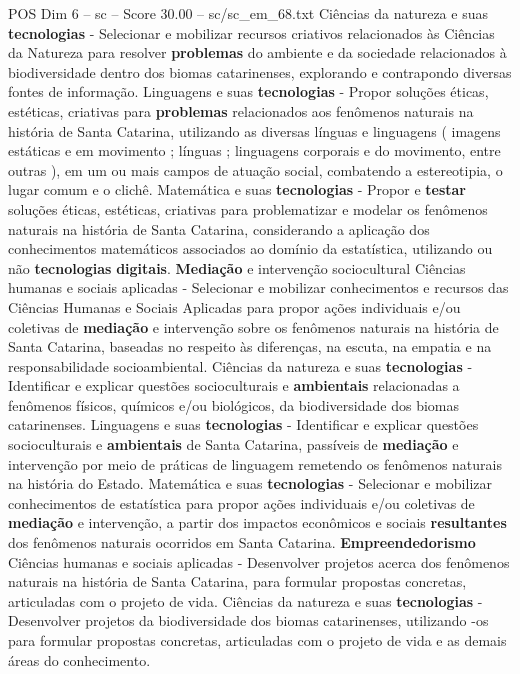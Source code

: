\begin{textsample}{POS Dim 6 – sc – Score 30.00 – sc/sc\_em\_68.txt}
Ciências da natureza e suas \textbf{tecnologias} - Selecionar e mobilizar recursos criativos relacionados às Ciências da Natureza para resolver \textbf{problemas} do ambiente e da sociedade relacionados à biodiversidade dentro dos biomas catarinenses, explorando e contrapondo diversas fontes de informação.
Linguagens e suas \textbf{tecnologias} - Propor soluções éticas, estéticas, criativas para \textbf{problemas} relacionados aos fenômenos naturais na história de Santa Catarina, utilizando as diversas línguas e linguagens ( imagens estáticas e em movimento ; línguas ; linguagens corporais e do movimento, entre outras ), em um ou mais campos de atuação social, combatendo a estereotipia, o lugar comum e o clichê.
Matemática e suas \textbf{tecnologias} - Propor e \textbf{testar} soluções éticas, estéticas, criativas para problematizar e modelar os fenômenos naturais na história de Santa Catarina, considerando a aplicação dos conhecimentos matemáticos associados ao domínio da estatística, utilizando ou não \textbf{tecnologias} \textbf{digitais}. \textbf{Mediação} e intervenção sociocultural Ciências humanas e sociais aplicadas - Selecionar e mobilizar conhecimentos e recursos das Ciências Humanas e Sociais Aplicadas para propor ações individuais e/ou coletivas de \textbf{mediação} e intervenção sobre os fenômenos naturais na história de Santa Catarina, baseadas no respeito às diferenças, na escuta, na empatia e na responsabilidade socioambiental.
Ciências da natureza e suas \textbf{tecnologias} - Identificar e explicar questões socioculturais e \textbf{ambientais} relacionadas a fenômenos físicos, químicos e/ou biológicos, da biodiversidade dos biomas catarinenses.
Linguagens e suas \textbf{tecnologias} - Identificar e explicar questões socioculturais e \textbf{ambientais} de Santa Catarina, passíveis de \textbf{mediação} e intervenção por meio de práticas de linguagem remetendo os fenômenos naturais na história do Estado.
Matemática e suas \textbf{tecnologias} - Selecionar e mobilizar conhecimentos de estatística para propor ações individuais e/ou coletivas de \textbf{mediação} e intervenção, a partir dos impactos econômicos e sociais \textbf{resultantes} dos fenômenos naturais ocorridos em Santa Catarina. \textbf{Empreendedorismo} Ciências humanas e sociais aplicadas - Desenvolver projetos acerca dos fenômenos naturais na história de Santa Catarina, para formular propostas concretas, articuladas com o projeto de vida.
Ciências da natureza e suas \textbf{tecnologias} - Desenvolver projetos da biodiversidade dos biomas catarinenses, utilizando -os para formular propostas concretas, articuladas com o projeto de vida e as demais áreas do conhecimento.

\end{textsample}
